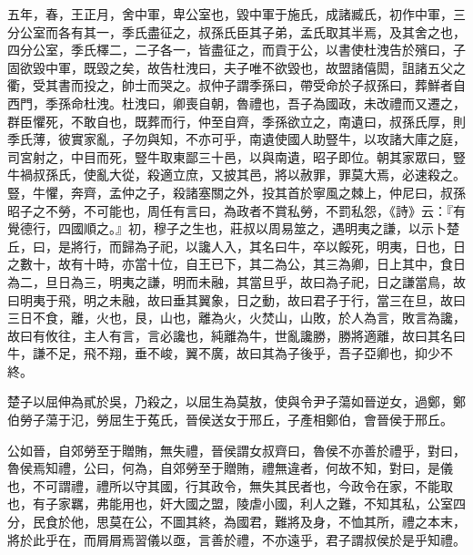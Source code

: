 \begin{pinyinscope}
五年，春，王正月，舍中軍，卑公室也，毀中軍于施氏，成諸臧氏，初作中軍，三分公室而各有其一，季氏盡征之，叔孫氏臣其子弟，孟氏取其半焉，及其舍之也，四分公室，季氏檡二，二子各一，皆盡征之，而貢于公，以書使杜洩告於殯曰，子固欲毀中軍，既毀之矣，故告杜洩曰，夫子唯不欲毀也，故盟諸僖閎，詛諸五父之衢，受其書而投之，帥士而哭之。叔仲子謂季孫曰，帶受命於子叔孫曰，葬鮮者自西門，季孫命杜洩。杜洩曰，卿喪自朝，魯禮也，吾子為國政，未改禮而又遷之，群臣懼死，不敢自也，既葬而行，仲至自齊，季孫欲立之，南遺曰，叔孫氏厚，則季氏薄，彼實家亂，子勿與知，不亦可乎，南遺使國人助豎牛，以攻諸大庫之庭，司宮射之，中目而死，豎牛取東鄙三十邑，以與南遺，昭子即位。朝其家眾曰，豎牛禍叔孫氏，使亂大從，殺適立庶，又披其邑，將以赦罪，罪莫大焉，必速殺之。豎，牛懼，奔齊，孟仲之子，殺諸塞關之外，投其首於寧風之棘上，仲尼曰，叔孫昭子之不勞，不可能也，周任有言曰，為政者不賞私勞，不罰私怨，《詩》云：『有覺德行，四國順之。』初，穆子之生也，莊叔以周易筮之，遇明夷之謙，以示卜楚丘，曰，是將行，而歸為子祀，以讒人入，其名曰牛，卒以餒死，明夷，日也，日之數十，故有十時，亦當十位，自王已下，其二為公，其三為卿，日上其中，食日為二，旦日為三，明夷之謙，明而未融，其當旦乎，故曰為子祀，日之謙當鳥，故曰明夷于飛，明之未融，故曰垂其翼象，日之動，故曰君子于行，當三在旦，故曰三日不食，離，火也，艮，山也，離為火，火焚山，山敗，於人為言，敗言為讒，故曰有攸往，主人有言，言必讒也，純離為牛，世亂讒勝，勝將適離，故曰其名曰牛，謙不足，飛不翔，垂不峻，翼不廣，故曰其為子後乎，吾子亞卿也，抑少不終。

楚子以屈伸為貳於吳，乃殺之，以屈生為莫敖，使與令尹子蕩如晉逆女，過鄭，鄭伯勞子蕩于氾，勞屈生于菟氏，晉侯送女于邢丘，子產相鄭伯，會晉侯于邢丘。

公如晉，自郊勞至于贈賄，無失禮，晉侯謂女叔齊曰，魯侯不亦善於禮乎，對曰，魯侯焉知禮，公曰，何為，自郊勞至于贈賄，禮無違者，何故不知，對曰，是儀也，不可謂禮，禮所以守其國，行其政令，無失其民者也，今政令在家，不能取也，有子家羈，弗能用也，奸大國之盟，陵虐小國，利人之難，不知其私，公室四分，民食於他，思莫在公，不圖其終，為國君，難將及身，不恤其所，禮之本末，將於此乎在，而屑屑焉習儀以亟，言善於禮，不亦遠乎，君子謂叔侯於是乎知禮。


\end{pinyinscope}
